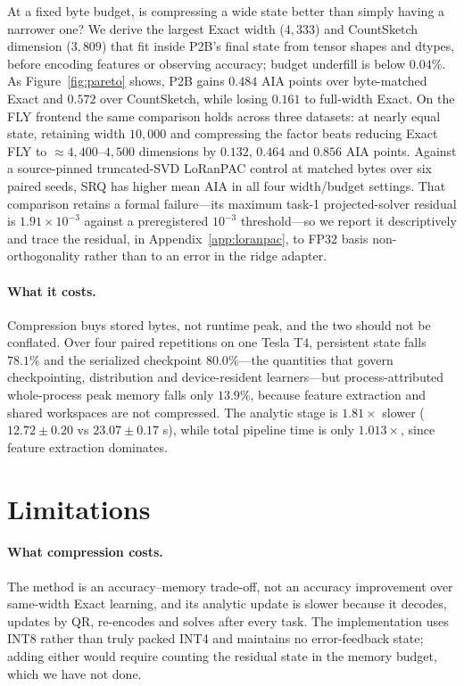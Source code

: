 \documentclass{article}
\begin{document}
At a fixed byte budget, is compressing a wide state better than simply having a
narrower one? We derive the largest Exact width ($4{,}333$) and CountSketch
dimension ($3{,}809$) that fit inside P2B's final state from tensor shapes and
dtypes, before encoding features or observing accuracy; budget underfill is
below $0.04\%$. As Figure~\ref{fig:pareto} shows, P2B gains $0.484$ AIA points
over byte-matched Exact and $0.572$ over CountSketch, while losing $0.161$ to
full-width Exact. On the FLY
frontend the same comparison holds across three datasets: at nearly equal
state, retaining width $10{,}000$ and compressing the factor beats reducing
Exact FLY to $\approx4{,}400$--$4{,}500$ dimensions by $0.132$, $0.464$ and
$0.856$ AIA points. Against a source-pinned truncated-SVD LoRanPAC control at
matched bytes over six paired seeds, SRQ has higher mean AIA in all four
width/budget settings. That comparison retains a formal failure---its maximum
task-1 projected-solver residual is $1.91\times10^{-3}$ against a preregistered
$10^{-3}$ threshold---so we report it descriptively and trace the residual, in
Appendix~\ref{app:loranpac}, to FP32 basis non-orthogonality rather than to an
error in the ridge adapter.

\paragraph{What it costs.} Compression buys stored bytes, not runtime peak, and
the two should not be conflated. Over four paired repetitions on one Tesla T4,
persistent state falls $78.1\%$ and the serialized checkpoint $80.0\%$---the
quantities that govern checkpointing, distribution and device-resident
learners---but process-attributed whole-process peak memory falls only
$13.9\%$, because feature extraction and shared workspaces are not compressed.
The analytic stage is $1.81\times$ slower ($12.72\pm0.20$ vs $23.07\pm0.17$ s),
while total pipeline time is only $1.013\times$, since feature extraction
dominates.

\section{Limitations}
\label{sec:limitations}

\paragraph{What compression costs.}
The method is an accuracy--memory trade-off, not an accuracy improvement over
same-width Exact learning, and its analytic update is slower because it
decodes, updates by QR, re-encodes and solves after every task. The
implementation uses INT8 rather than truly packed INT4 and maintains no
error-feedback state; adding either would require counting the residual state
in the memory budget, which we have not done.
\end{document}
